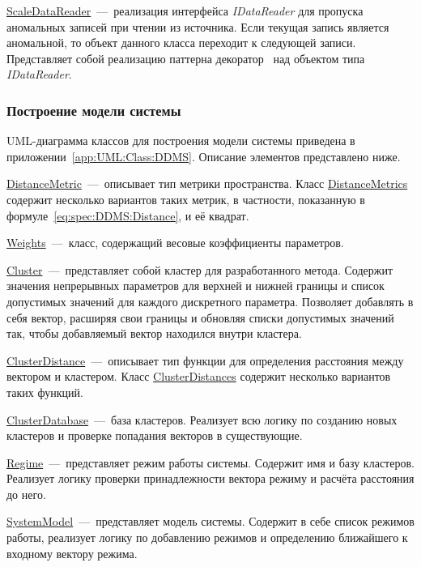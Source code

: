 \uline{ScaleDataReader}~---~реализация интерфейса \textit{IDataReader} для пропуска аномальных записей при чтении из источника. Если текущая запись является аномальной, то объект данного класса переходит к следующей записи. Представляет собой реализацию паттерна декоратор~\cite{GangOfFourDesignPatterns} над объектом типа \textit{IDataReader}.

\subsubsection{Построение модели системы}
UML-диаграмма классов для построения модели системы приведена в приложении~\ref{app:UML:Class:DDMS}. Описание элементов представлено ниже.

\uline{DistanceMetric}~---~описывает тип метрики пространства. Класс \uline{DistanceMetrics} содержит несколько вариантов таких метрик, в частности, показанную в формуле~\eqref{eq:spec:DDMS:Distance}, и её квадрат.

\uline{Weights}~---~класс, содержащий весовые коэффициенты параметров.

\uline{Cluster}~---~представляет собой кластер для разработанного метода. Содержит значения непрерывных параметров для верхней и нижней границы и список допустимых значений для каждого дискретного параметра. Позволяет добавлять в себя вектор, расширяя свои границы и обновляя списки допустимых значений так, чтобы добавляемый вектор находился внутри кластера.

\uline{ClusterDistance}~---~описывает тип функции для определения расстояния между вектором и кластером. Класс \uline{ClusterDistances} содержит несколько вариантов таких функций.

\uline{ClusterDatabase}~---~база кластеров. Реализует всю логику по созданию новых кластеров и проверке попадания векторов в существующие.

\uline{Regime}~---~представляет режим работы системы. Содержит имя и базу кластеров. Реализует логику проверки принадлежности вектора режиму и расчёта расстояния до него.

\uline{SystemModel}~---~представляет модель системы. Содержит в себе список режимов работы, реализует логику по добавлению режимов и определению ближайшего к входному вектору режима.

\FloatBarrier